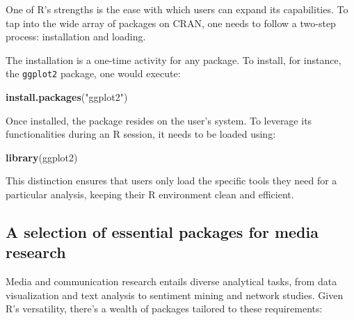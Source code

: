 \documentclass[
  b5paper]{book}
\newenvironment{Shaded}{\begin{snugshade}}{\end{snugshade}}
\newcommand{\FunctionTok}[1]{\textcolor[rgb]{0.13,0.29,0.53}{\textbf{#1}}}
\newcommand{\NormalTok}[1]{#1}
\newcommand{\StringTok}[1]{\textcolor[rgb]{0.31,0.60,0.02}{#1}}
\begin{document}
One of R's strengths is the ease with which users can expand its capabilities. To tap into the wide array of packages on CRAN, one needs to follow a two-step process: installation and loading.

The installation is a one-time activity for any package. To install, for instance, the \texttt{ggplot2} package, one would execute:

\begin{Shaded}
\begin{Highlighting}[]
\FunctionTok{install.packages}\NormalTok{(}\StringTok{"ggplot2"}\NormalTok{)}
\end{Highlighting}
\end{Shaded}

Once installed, the package resides on the user's system. To leverage its functionalities during an R session, it needs to be loaded using:

\begin{Shaded}
\begin{Highlighting}[]
\FunctionTok{library}\NormalTok{(ggplot2)}
\end{Highlighting}
\end{Shaded}

This distinction ensures that users only load the specific tools they need for a particular analysis, keeping their R environment clean and efficient.

\hypertarget{a-selection-of-essential-packages-for-media-research}{%
\subsection*{A selection of essential packages for media research}\label{a-selection-of-essential-packages-for-media-research}}

Media and communication research entails diverse analytical tasks, from data visualization and text analysis to sentiment mining and network studies. Given R's versatility, there's a wealth of packages tailored to these requirements:
\end{document}
